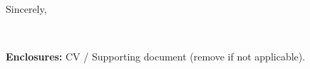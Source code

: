 \vspace{5pt}
Sincerely,

\vspace{18pt}
\textbf{\sendername}\\
{\small\color{muted}\senderrole}

\vfill
{\small\color{muted}\textbf{Enclosures:} CV / Supporting document (remove if not applicable).}
